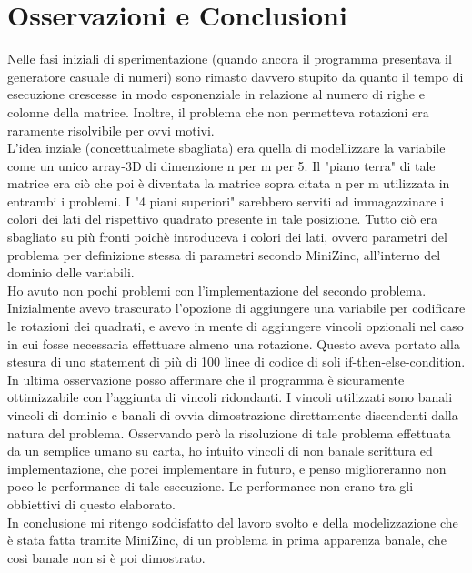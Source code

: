 \documentclass{article}
\begin{document}
\section{Osservazioni e Conclusioni}
Nelle fasi iniziali di sperimentazione (quando ancora il programma presentava il generatore casuale di numeri) sono rimasto davvero stupito da quanto il tempo di esecuzione crescesse in modo esponenziale in relazione al numero di righe e colonne della matrice. Inoltre, il problema che non permetteva rotazioni era raramente risolvibile per ovvi motivi.\\
L'idea inziale (concettualmete sbagliata) era quella di modellizzare la variabile come un unico array-3D di dimenzione n per m per 5. Il "piano terra" di tale matrice era ciò che poi è diventata la matrice sopra citata n per m utilizzata in entrambi  i problemi. I "4 piani superiori" sarebbero serviti ad immagazzinare i colori dei lati del rispettivo quadrato presente in tale posizione. Tutto ciò era sbagliato su più fronti poichè introduceva i colori dei lati, ovvero parametri del problema per definizione stessa di parametri secondo MiniZinc, all'interno del dominio delle variabili.\\
Ho avuto non pochi problemi con l'implementazione del secondo problema. Inizialmente avevo trascurato l'opozione di aggiungere una variabile per codificare le rotazioni dei quadrati, e avevo in mente di aggiungere vincoli opzionali nel caso in cui fosse necessaria effettuare almeno una rotazione. Questo aveva portato alla stesura di uno statement di più di 100 linee di codice di soli if-then-else-condition.\\
In ultima osservazione posso affermare che il programma è sicuramente ottimizzabile con l'aggiunta di vincoli ridondanti. I vincoli utilizzati sono banali vincoli di dominio e banali di ovvia dimostrazione direttamente discendenti dalla natura del problema. Osservando però la risoluzione di tale problema effettuata da un semplice umano su carta, ho intuito vincoli di non banale scrittura ed implementazione, che porei implementare in futuro, e penso miglioreranno non poco le performance di tale esecuzione. Le performance non erano tra gli obbiettivi di questo elaborato.\\
In conclusione mi ritengo soddisfatto del lavoro svolto e della modelizzazione che è stata fatta tramite MiniZinc, di un problema in prima apparenza banale, che così banale non si è poi dimostrato.
\end{document}
